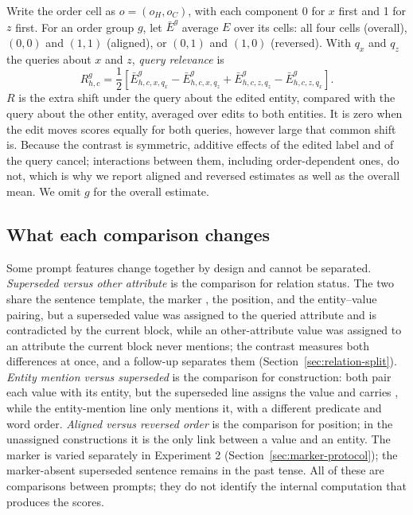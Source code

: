 Write the order cell as $o=(o_H,o_C)$, with each component 0 for $x$ first and 1 for $z$ first. For an order group $g$, let $\bar E^g$ average $E$ over its cells: all four cells (overall), $(0,0)$ and $(1,1)$ (aligned), or $(0,1)$ and $(1,0)$ (reversed). With $q_x$ and $q_z$ the queries about $x$ and $z$, \emph{query relevance} is
\begin{equation}
R^g_{h,c}=\frac12\left[
\bar E^g_{h,c,x,q_x}-\bar E^g_{h,c,x,q_z}
+\bar E^g_{h,c,z,q_z}-\bar E^g_{h,c,z,q_x}
\right].
\end{equation}
$R$ is the extra shift under the query about the edited entity, compared with the query about the other entity, averaged over edits to both entities. It is zero when the edit moves scores equally for both queries, however large that common shift is. Because the contrast is symmetric, additive effects of the edited label and of the query cancel; interactions between them, including order-dependent ones, do not, which is why we report aligned and reversed estimates as well as the overall mean. We omit $g$ for the overall estimate.

\subsection{What each comparison changes}
\label{sec:decomposition-logic}

Some prompt features change together by design and cannot be separated. \emph{Superseded versus other attribute} is the comparison for relation status. The two share the sentence template, the marker , the position, and the entity--value pairing, but a superseded value was assigned to the queried attribute and is contradicted by the current block, while an other-attribute value was assigned to an attribute the current block never mentions; the contrast measures both differences at once, and a follow-up separates them (Section~\ref{sec:relation-split}). \emph{Entity mention versus superseded} is the comparison for construction: both pair each value with its entity, but the superseded line assigns the value and carries , while the entity-mention line only mentions it, with a different predicate and word order. \emph{Aligned versus reversed order} is the comparison for position; in the unassigned constructions it is the only link between a value and an entity. The marker is varied separately in Experiment 2 (Section~\ref{sec:marker-protocol}); the marker-absent superseded sentence remains in the past tense. All of these are comparisons between prompts; they do not identify the internal computation that produces the scores.
